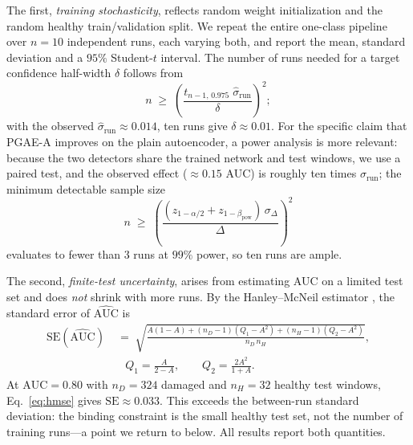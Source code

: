 \documentclass[11pt,a4paper]{article}
\begin{document}
The first, \emph{training stochasticity}, reflects random weight initialization
and the random healthy train/validation split. We repeat the entire one-class
pipeline over $n=10$ independent runs, each varying both, and report the mean,
standard deviation and a $95\%$ Student-$t$ interval. The number of runs needed
for a target confidence half-width $\delta$ follows from
\begin{equation}
n \;\ge\; \left(\frac{t_{n-1,\,0.975}\;\hat\sigma_{\mathrm{run}}}{\delta}\right)^{\!2};
\label{eq:seedn}
\end{equation}
with the observed $\hat\sigma_{\mathrm{run}}\approx0.014$, ten runs give
$\delta\approx0.01$. For the specific claim that PGAE-A improves on the plain
autoencoder, a power analysis is more relevant: because the two detectors share
the trained network and test windows, we use a paired test, and the observed
effect ($\approx0.15$ AUC) is roughly ten times $\sigma_{\mathrm{run}}$; the
minimum detectable sample size
\begin{equation}
n \;\ge\; \left(\frac{(z_{1-\alpha/2}+z_{1-\beta_{\mathrm{pow}}})\,\sigma_\Delta}{\Delta}\right)^{\!2}
\label{eq:powern}
\end{equation}
evaluates to fewer than 3 runs at $99\%$ power, so ten runs are ample.

The second, \emph{finite-test uncertainty}, arises from estimating AUC on a
limited test set and does \emph{not} shrink with more runs. By the Hanley--McNeil estimator
\cite{hanley1982}, the standard error of $\widehat{\mathrm{AUC}}$ is
\begin{equation}
\begin{split}
\mathrm{SE}\!\left(\widehat{\mathrm{AUC}}\right)
&\;=\; \sqrt{\frac{A(1-A)+(n_D-1)(Q_1-A^2)+(n_H-1)(Q_2-A^2)}{n_D\,n_H}},\\[4pt]
&\quad Q_1=\frac{A}{2-A},\qquad Q_2=\frac{2A^2}{1+A}.
\end{split}
\label{eq:hmse}
\end{equation}
At $\mathrm{AUC}=0.80$ with $n_D=324$ damaged and $n_H=32$ healthy test windows,
Eq.~\eqref{eq:hmse} gives $\mathrm{SE}\approx0.033$. This exceeds the
between-run standard deviation: the binding constraint is the small healthy
test set, not the number of training runs---a point we return to below. All results
report both quantities.
\end{document}

